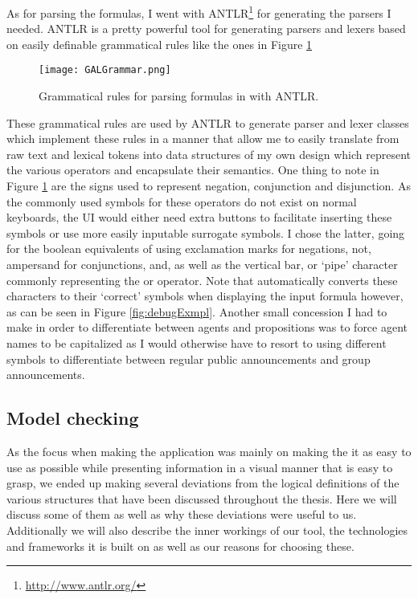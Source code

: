 As for parsing the formulas, I went with ANTLR\footnote{\url{http://www.antlr.org/}} for generating the parsers I needed. ANTLR is a pretty powerful tool for generating parsers and lexers based on easily definable grammatical rules like the ones in Figure \ref{fig:grammar}

\begin{figure}[h]
	\label{fig:grammar}
	\caption{Grammatical rules for parsing formulas in \cname with ANTLR. }
	\texttt{[image: GALGrammar.png]}
\end{figure}



These grammatical rules are used by ANTLR to generate parser and lexer classes which implement these rules in a manner that allow me to easily translate from raw text and lexical tokens into data structures of my own design which represent the various operators and encapsulate their semantics. One thing to note in Figure \ref{fig:grammar} are the signs used to represent negation, conjunction and disjunction. As the commonly used symbols for these operators do not exist on normal keyboards, the UI would either need extra buttons to facilitate inserting these symbols or use more easily inputable surrogate symbols. I chose the latter, going for the boolean equivalents of using exclamation marks for negations, not, ampersand for conjunctions, and, as well as the vertical bar, or `pipe' character commonly representing the or operator. Note that \cname{} automatically converts these characters to their `correct' symbols when displaying the input formula however, as can be seen in Figure \ref{fig:debugExmpl}. 
Another small concession I had to make in order to differentiate between agents and propositions was to force agent names to be capitalized as I would otherwise have to resort to using different symbols to differentiate between regular public announcements and group announcements. 

\subsection{Model checking}

As the focus when making the application was mainly on making the it as easy to use as possible while presenting information in a visual manner that is easy to grasp, we ended up making several deviations from the logical definitions of the various structures that have been discussed throughout the thesis. Here we will discuss some of them as well as why these deviations were useful to us. Additionally we will also describe the inner workings of our tool, the technologies and frameworks it is built on as well as our reasons for choosing these.

